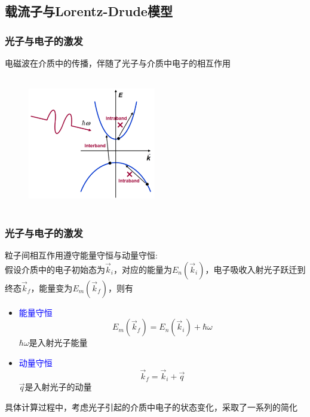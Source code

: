 \subsection{载流子与\rm{Lorentz-Drude}模型}
\frame
{
	\frametitle{光子与电子的激发}
	电磁波在介质中的传播，伴随了光子与介质中电子的相互作用
\begin{figure}[h!]
\centering
\vspace*{-10pt}
\includegraphics[height=2.3in,width=2.2in,viewport=0 0 800 800,clip]{Figures/Inter-Intra_band-transition.png}
\caption{\fontsize{5.5pt}{4.2pt}}%
\label{Optic-transition}
\end{figure} 
}

\frame
{
	\frametitle{光子与电子的激发}
	粒子间相互作用遵守能量守恒与动量守恒:~\\
	假设介质中的电子初始态为$\vec k_i$，对应的能量为$E_n(\vec k_i)$，电子吸收入射光子跃迁到终态$\vec k_f$，能量变为$E_m(\vec k_f)$，则有
	\begin{itemize}
		\item \textcolor{blue}{能量守恒}
			\begin{displaymath}
				E_m(\vec k_f)=E_n(\vec k_i)+\hbar\omega
			\end{displaymath}
			$\hbar\omega$是入射光子能量
		\item \textcolor{blue}{动量守恒}
			\begin{displaymath}
				\vec k_f=\vec k_i+\vec q
			\end{displaymath}
			$\vec q$是入射光子的动量
	\end{itemize}
	具体计算过程中，考虑光子引起的介质中电子的状态变化，采取了一系列的简化
}

